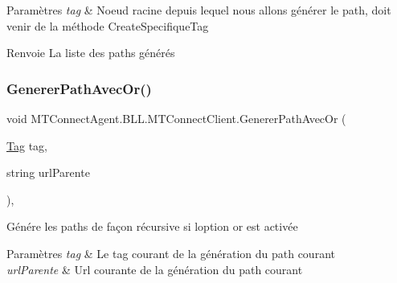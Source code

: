 \begin{DoxyParams}{Paramètres}
{\em tag} & Noeud racine depuis lequel nous allons générer le path, doit venir de la méthode Create\+Specifique\+Tag\\
\hline
\end{DoxyParams}
\begin{DoxyReturn}{Renvoie}
La liste des paths générés
\end{DoxyReturn}
\mbox{\label{class_m_t_connect_agent_1_1_b_l_l_1_1_m_t_connect_client_a7e6917938b6629de25db52ed84dba6c5}} 
\subsubsection{\texorpdfstring{Generer\+Path\+Avec\+Or()}{GenererPathAvecOr()}}
{\footnotesize\ttfamily void M\+T\+Connect\+Agent.\+B\+L\+L.\+M\+T\+Connect\+Client.\+Generer\+Path\+Avec\+Or (\begin{DoxyParamCaption}\item[{\mbox{\hyperlink{class_m_t_connect_agent_1_1_model_1_1_tag}{Tag}}}]{tag,  }\item[{string}]{url\+Parente }\end{DoxyParamCaption})\hspace{0.3cm}{\ttfamily [inline]}, {\ttfamily [private]}}



Génére les paths de façon récursive si l\textquotesingle{}option or est activée 


\begin{DoxyParams}{Paramètres}
{\em tag} & Le tag courant de la génération du path courant\\
\hline
{\em url\+Parente} & Url courante de la génération du path courant\\
\hline
\end{DoxyParams}
\mbox{\label{class_m_t_connect_agent_1_1_b_l_l_1_1_m_t_connect_client_a49be318d688f99f3fe6596c74eba7ca1}} 
